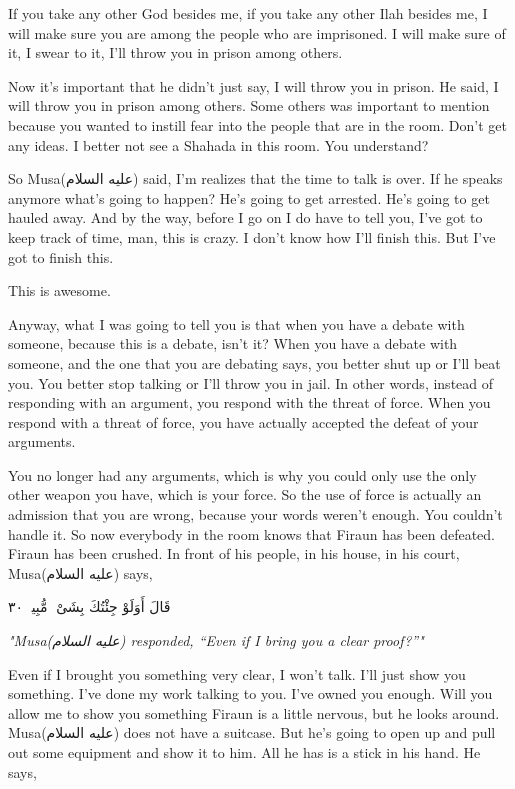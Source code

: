 \documentclass[12pt]{article}
\newcommand{\as}{\textarabic{(عليه السلام)}}
\begin{document}
If you take any other God besides me, if you take any other Ilah besides me, I will make sure you are among the people who are imprisoned. I will make sure of it, I swear to it, I'll throw you in prison among others. 

Now it's important that he didn't just say, I will throw you in prison. He said, I will throw you in prison among others. Some others was important to mention because you wanted to instill fear into the people that are in the room. Don't get any ideas. I better not see a Shahada in this room. You understand? 

So Musa\as{} said, I'm realizes that the time to talk is over. If he speaks anymore what's going to happen? He's going to get arrested. He's going to get hauled away. And by the way, before I go on I do have to tell you, I've got to keep track of time, man, this is crazy. I don't know how I'll finish this. But I've got to finish this. 

This is awesome. 

Anyway, what I was going to tell you is that when you have a debate with someone, because this is a debate, isn't it? When you have a debate with someone, and the one that you are debating says, you better shut up or I'll beat you. You better stop talking or I'll throw you in jail. In other words, instead of responding with an argument, you respond with the threat of force. When you respond with a threat of force, you have actually accepted the defeat of your arguments. 

You no longer had any arguments, which is why you could only use the only other weapon you have, which is your force. So the use of force is actually an admission that you are wrong, because your words weren't enough. You couldn't handle it. So now everybody in the room knows that Firaun has been defeated. Firaun has been crushed. In front of his people, in his house, in his court, Musa\as{} says, 

\textarabic{قَالَ أَوَلَوْ جِئْتُكَ بِشَىْءٍۢ مُّبِينٍۢ ٣٠}

\textit{"Musa\as{} responded, “Even if I bring you a clear proof?”"}

Even if I brought you something very clear, I won't talk. I'll just show you something. I've done my work talking to you. I've owned you enough. Will you allow me to show you something Firaun is a little nervous, but he looks around. Musa\as{} does not have a suitcase. But he's going to open up and pull out some equipment and show it to him. All he has is a stick in his hand. He says, 
\end{document}
